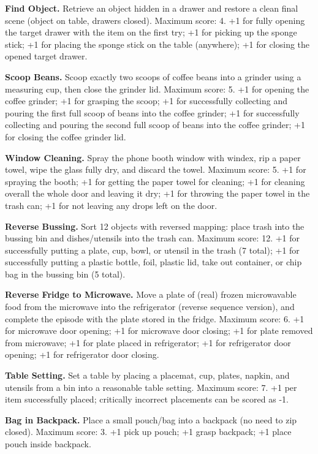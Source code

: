 \documentclass[conference]{IEEEtran}
\begin{document}
\noindent \textbf{Find Object.} Retrieve an object hidden in a drawer and restore a clean final scene (object on table, drawers closed).
Maximum score: 4. +1 for fully opening the target drawer with the item on the first try; +1 for picking up the sponge stick; +1 for placing the sponge stick on the table (anywhere); +1 for closing the opened target drawer.


\noindent \textbf{Scoop Beans.} Scoop exactly two scoops of coffee beans into a grinder using a measuring cup, then close the grinder lid. Maximum score: 5. +1 for opening the coffee grinder; +1 for grasping the scoop; +1 for successfully collecting and pouring the first full scoop of beans into the coffee grinder; +1 for successfully collecting and pouring the second full scoop of beans into the coffee grinder; +1 for closing the coffee grinder lid.

\noindent \textbf{Window Cleaning.} Spray the phone booth window with windex, rip a paper towel, wipe the glass fully dry, and discard the towel. Maximum score: 5. +1 for spraying the booth; +1 for getting the paper towel for cleaning; +1 for cleaning overall the whole door and leaving it dry; +1 for throwing the paper towel in the trash can; +1 for not leaving any drops left on the door.

\noindent \textbf{Reverse Bussing.} Sort 12 objects with reversed mapping: place trash into the bussing bin and dishes/utensils into the trash can. Maximum score: 12. +1 for successfully putting a plate, cup, bowl, or utensil in the trash (7 total); +1 for successfully putting a plastic bottle, foil, plastic lid, take out container, or chip bag in the bussing bin (5 total).

\noindent \textbf{Reverse Fridge to Microwave.} Move a plate of (real) frozen microwavable food from the microwave into the refrigerator (reverse sequence version), and complete the episode with the plate stored in the fridge.
Maximum score: 6. +1 for microwave door opening; +1 for microwave door closing; +1 for plate removed from microwave; +1 for plate placed in refrigerator; +1 for refrigerator door opening; +1 for refrigerator door closing.

\noindent \textbf{Table Setting.} Set a table by placing a placemat, cup, plates, napkin, and utensils from a bin into a reasonable table setting.
Maximum score: 7. +1 per item successfully placed; critically incorrect placements can be scored as -1.

\noindent \textbf{Bag in Backpack.} Place a small pouch/bag into a backpack (no need to zip closed).
Maximum score: 3. +1 pick up pouch; +1 grasp backpack; +1 place pouch inside backpack.
\end{document}
